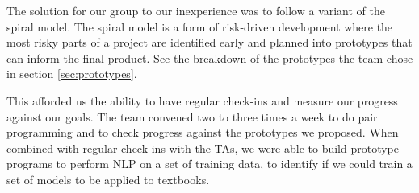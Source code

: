 The solution for our group to our inexperience was to follow a variant
of the spiral model.
The spiral model is a form of risk-driven development where the most
risky parts of a project are identified early and planned into
prototypes that can inform the final product.
See the breakdown of the prototypes the team chose in section
\ref{sec:prototypes}.

This afforded us the ability to have regular check-ins and measure our
progress against our goals.
The team convened two to three times a week to do pair programming and
to check progress against the prototypes we proposed.
When combined with regular check-ins with the TAs, we were able to
build prototype programs to perform NLP on a set of training data, to
identify if we could train a set of models to be applied to
textbooks. 

